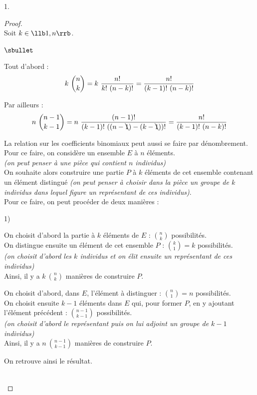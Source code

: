 \begin{noliste}{1.}
  \begin{proof}~\\%
    Soit $k \in \llb 1, n \rrb$.
    \begin{noliste}{$\sbullet$}
    \item Tout d'abord :
      \[
      k \ \dbinom{n}{k} = k \ \dfrac{n!}{k! \ (n-k)!} =
      \dfrac{n!}{(k-1)! \ (n-k)!}
      \]
    \item Par ailleurs :
      \[
      n \ \dbinom{n-1}{k-1} = n \ \dfrac{(n-1)!}{(k-1)! \
        ((n-\bcancel{1})-(k-\bcancel{1}))!} = \dfrac{n!}{(k-1)! \
        (n-k)!}
      \]
    \end{noliste}
    \begin{remark}
      La relation sur les coefficients binomiaux peut aussi se
      faire par dénombrement.\\
      Pour ce faire, on considère un ensemble $E$ à $n$ éléments.\\
      {\it (on peut penser à une pièce qui contient $n$
        individus)}\\
      On souhaite alors construire une partie $P$ à $k$ éléments de
      cet ensemble contenant un élément distingué {\it (on peut
        penser à choisir dans la pièce un groupe de $k$ individus
        dans lequel figure un représentant de ces individus)}.\\
      Pour ce faire, on peut procéder de deux manières :
      \begin{noliste}{1)}
      \item On choisit d'abord la partie à $k$ éléments de $E$ :
        $\binom{n}{k}$ possibilités.\\[.1cm]
        On distingue ensuite un élément de cet ensemble $P$ :
        $\binom{k}{1} = k$ possibilités.\\
        {\it (on choisit d'abord les $k$ individus et on élit
          ensuite un représentant de ces individus)}\\[.1cm]
        Ainsi, il y a $k \ \binom{n}{k}$ manières de construire $P$.
        
      \item On choisit d'abord, dans $E$, l'élément à distinguer :
        $\binom{n}{1} = n$ possibilités.\\[.1cm]
        On choisit ensuite $k-1$ éléments dans $E$ qui, pour former
        $P$, en y ajoutant l'élément précédent : $\binom{n-1}{k-1}$
        possibilités.\\
        {\it (on choisit d'abord le représentant puis on lui adjoint
          un groupe de $k-1$ individus)}\\[.1cm]
        Ainsi, il y a $n \ \binom{n-1}{k-1}$ manières de construire
        $P$.
      \end{noliste}
      On retrouve ainsi le résultat.
    \end{remark}~\\[-1.4cm]
  \end{proof}


\end{noliste}

